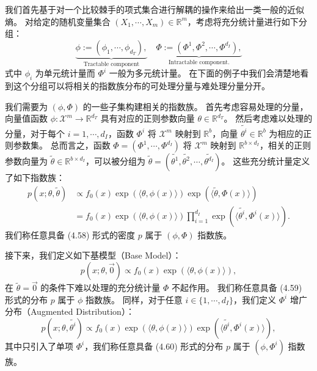 我们首先基于对一个比较棘手的项式集合进行解耦的操作来给出一类一般的近似熵。
对给定的随机变量集合 $(X_1, \cdots, X_m) \in \mathbb{R}^m$，考虑将充分统计量进行如下分组：
\begin{equation}
    \underbrace{\phi := (\phi_1, \cdots, \phi_{d_T}),}_{\text{Tractable component}} \quad \underbrace{\Phi := (\Phi^1, \Phi^2, \cdots, \Phi^{d_I}),}_{\text{Intractable component.}}
\end{equation}
式中 $\phi_i$ 为单元统计量而 $\Phi^i$ 一般为多元统计量。
在下面的例子中我们会清楚地看到这个分组可以将相关的指数族分布的可处理分量与难处理分量分开。

我们需要为 $(\phi, \Phi)$ 的一些子集构建相关的指数族。
首先考虑容易处理的分量，向量值函数 $\phi: \mathcal{X}^m \rightarrow \mathbb{R}^{d_T}$ 具有对应的正则参数向量 $\theta \in \mathbb{R}^{d_T}$。
然后考虑难以处理的分量，对于每个 $i = 1, \cdots, d_I$，函数 $\Phi^i$ 将 $\mathcal{X}^m$ 映射到 $\mathbb{R}^b$，向量 $\tilde{\theta^i} \in \mathbb{R}^b$ 为相应的正则参数集。
总而言之，函数 $\Phi = (\Phi^1, \cdots, \Phi^{d_I})$ 将 $\mathcal{X}^m$ 映射到 $\mathbb{R}^{b\times d_I}$，相关的正则参数向量为 $\tilde{\theta} \in \mathbb{R}^{b\times d_I}$，可以被分组为 $\tilde{\theta} = (\tilde{\theta^1}, \tilde{\theta^2}, \cdots, \tilde{\theta^{d_I}})$。
这些充分统计量定义了如下指数族：
\begin{align}
    p(x; \theta, \tilde{\theta}) &\propto f_0(x)\exp(\langle\theta, \phi(x)\rangle)\exp(\langle\tilde{\theta}, \Phi(x)\rangle) \nonumber \\
    &= f_0(x)\exp(\langle\theta, \phi(x)\rangle)\prod_{i = 1}^{d_I}\exp(\langle\tilde{\theta^i}, \Phi^i(x)\rangle).
\end{align}
我们称任意具备 (4.58) 形式的密度 $p$ 属于 $(\phi, \Phi)$ 指数族。

接下来，我们定义如下基模型（Base Model）：
\begin{equation}
    p(x; \theta, \vec{0}) \propto f_0(x)\exp(\langle\theta, \phi(x)\rangle), 
\end{equation}
在 $\tilde{\theta} = \vec{0}$ 的条件下难以处理的充分统计量 $\Phi$ 不起作用。
我们称任意具备 (4.59) 形式的分布 $p$ 属于 $\phi$ 指数族。
同样，对于任意 $i \in \{1, \cdots, d_I\}$，我们定义 $\Phi^i$ 增广分布（Augmented Distribution）：
\begin{equation}
    p(x; \theta, \tilde{\theta^i}) \propto f_0(x)\exp(\langle\theta, \phi(x)\rangle)\exp(\langle\tilde{\theta^i}, \Phi^i(x)\rangle), 
\end{equation}
其中只引入了单项 $\Phi^i$，我们称任意具备 (4.60) 形式的分布 $p$ 属于 $(\phi, \Phi^i)$ 指数族。

